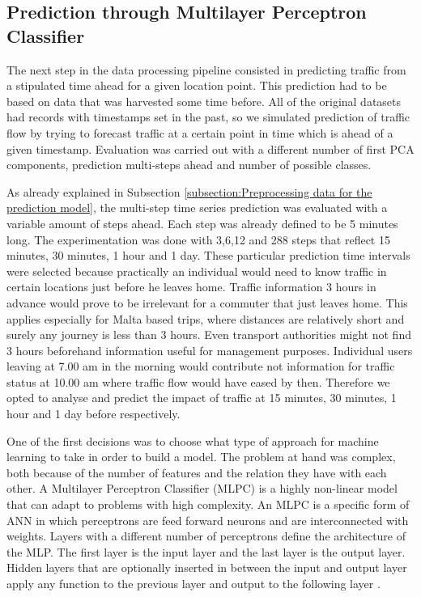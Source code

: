 \documentclass[12pt, a4paper]{report}
\theoremstyle{definition}
\theoremstyle{definition}%
\theoremstyle{definition}%
\theoremstyle{definition}%
\theoremstyle{definition}%
\theoremstyle{definition}%
\begin{document}
\subsection{Prediction through Multilayer Perceptron Classifier}


The next step in the data processing pipeline consisted in predicting traffic from a stipulated time ahead for a given location point. This prediction had to be based on data that was harvested some time before. All of the original datasets had records with timestamps set in the past, so we simulated prediction of traffic flow by trying to forecast traffic at a certain point in time which is ahead of a given timestamp. Evaluation was carried out with a different number of first PCA components, prediction multi-steps ahead and number of possible classes.

As already explained in Subsection \ref{subsection:Preprocessing data for the prediction model}, the multi-step time series prediction was evaluated with a variable amount of steps ahead. Each step was already defined to be 5 minutes long. The experimentation was done with 3,6,12 and 288 steps that reflect 15 minutes, 30 minutes, 1 hour and 1 day. These particular prediction time intervals were selected because practically an individual would need to know traffic in certain locations just before he leaves home. Traffic information 3 hours in advance would prove to be irrelevant for a commuter that just leaves home. This applies especially for Malta based trips, where distances are relatively short and surely any journey is less than 3 hours. Even transport authorities might not find 3 hours beforehand information useful for management purposes. Individual users leaving at 7.00 am in the morning would contribute not information for traffic status at 10.00 am where traffic flow would have eased by then. Therefore we opted to analyse and predict the impact of traffic at 15 minutes, 30 minutes, 1 hour and 1 day before respectively.

One of the first decisions was to choose what type of approach for machine learning to take in order to build a model. The problem at hand was complex, both because of the number of features and the relation they have with each other. A Multilayer Perceptron Classifier (MLPC) is a highly non-linear model that can adapt to problems with high complexity. An MLPC is a specific form of ANN in which perceptrons are feed forward neurons and are interconnected with weights. Layers with a different number of perceptrons define the architecture of the MLP. The first layer is the input layer and the last layer is the output layer. Hidden layers that are optionally inserted in between the input and output layer apply any function to the previous layer and output to the following layer \cite{Jain1996}.
\end{document}
